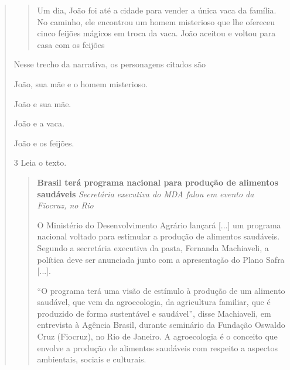\begin{quote}
\begin{quote}
Um dia, João foi até a cidade para vender a única vaca da família. No
caminho, ele encontrou um homem misterioso que lhe ofereceu cinco
feijões mágicos em troca da vaca. João aceitou e voltou para casa com os
feijões
\end{quote}

Nesse trecho da narrativa, os personagens citados são

\begin{escolha}
\item João, sua mãe e o homem misterioso.

\item João e sua mãe.

\item João e a vaca.

\item João e os feijões.
\end{escolha}


\num{3} Leia o texto.

\begin{quote}
\textbf{Brasil terá programa nacional para produção de alimentos saudáveis}
\textit{Secretária executiva do MDA falou em evento da Fiocruz, no Rio}

O Ministério do Desenvolvimento Agrário lançará {[}...{]} um programa nacional voltado para estimular a produção de alimentos saudáveis. Segundo a secretária executiva da pasta, Fernanda Machiaveli, a política deve ser anunciada junto com a apresentação do Plano Safra {[}...{]}.

``O programa terá uma visão de estímulo à produção de um alimento saudável, que vem da agroecologia, da agricultura familiar, que é produzido de forma sustentável e saudável'', disse Machiaveli, em entrevista à Agência Brasil, durante seminário da Fundação Oswaldo Cruz (Fiocruz), no Rio de Janeiro. A agroecologia é o conceito que envolve a produção de alimentos saudáveis com respeito a aspectos ambientais, sociais e culturais.


\end{quote}
\end{quote}
